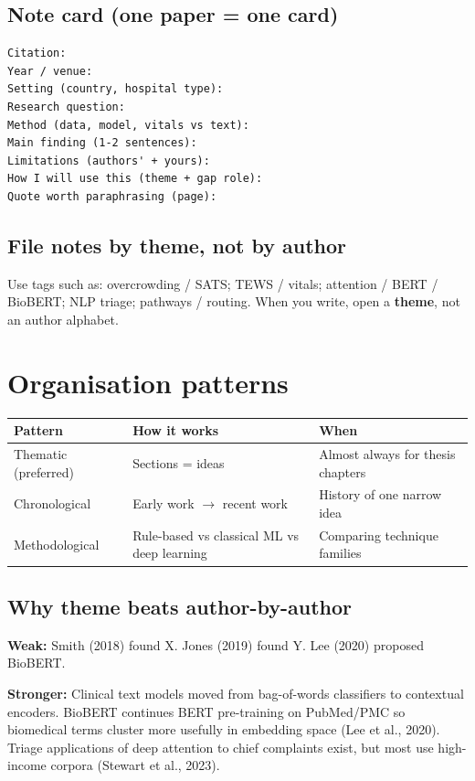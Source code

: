 \documentclass[11pt,a4paper]{article}
\begin{document}
\subsection{Note card (one paper = one card)}
\begin{lstlisting}
Citation:
Year / venue:
Setting (country, hospital type):
Research question:
Method (data, model, vitals vs text):
Main finding (1-2 sentences):
Limitations (authors' + yours):
How I will use this (theme + gap role):
Quote worth paraphrasing (page):
\end{lstlisting}

\subsection{File notes by theme, not by author}
Use tags such as: overcrowding / SATS; TEWS / vitals; attention / BERT / BioBERT; NLP triage; pathways / routing.
When you write, open a \textbf{theme}, not an author alphabet.

\section{Organisation patterns}

\begin{center}
\begin{tabular}{@{}p{}p{}p{}@{}}
\toprule
\textbf{Pattern} & \textbf{How it works} & \textbf{When} \\
\midrule
Thematic (preferred) &
Sections = ideas &
Almost always for thesis chapters \\
Chronological &
Early work \(\to\) recent work &
History of one narrow idea \\
Methodological &
Rule-based vs classical ML vs deep learning &
Comparing technique families \\
\bottomrule
\end{tabular}
\end{center}

\subsection{Why theme beats author-by-author}

\begin{examplebox}
\textbf{Weak:} Smith (2018) found X. Jones (2019) found Y. Lee (2020) proposed BioBERT.

\textbf{Stronger:} Clinical text models moved from bag-of-words classifiers to contextual encoders.
BioBERT continues BERT pre-training on PubMed/PMC so biomedical terms cluster more usefully in embedding space (Lee et al., 2020).
Triage applications of deep attention to chief complaints exist, but most use high-income corpora (Stewart et al., 2023).
\end{examplebox}
\end{document}
